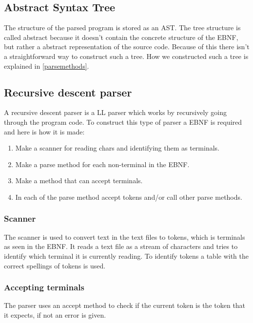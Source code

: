 	\subsection{Abstract Syntax Tree}
		The structure of the parsed program is stored as an AST. The tree structure is called abstract because it doesn't contain the concrete
		structure of the EBNF, but rather a abstract representation of the source code. Because of this there isn't a straightforward way to 
		construct such a tree. How we constructed such a tree is explained in \ref{parsemethods}.
			
	\subsection{Recursive descent parser}
		A recursive descent parser is a LL parser which works by recursively going through the program code.
		To construct this type of parser a EBNF is required and here is how it is made:
		\begin{enumerate}
			\item Make a scanner for reading chars and identifying them as terminals.
			\item Make a parse method for each non-terminal in the EBNF.
			\item Make a method that can accept terminals.
			\item In each of the parse method accept tokens and/or call other parse methods.
		\end{enumerate}
	
		\subsubsection{Scanner}
			The scanner is used to convert text in the text files to tokens, which is terminals as seen in the EBNF. 
			It reads a text file as a stream of characters and tries to identify which terminal it is currently reading.
			To identify tokens a table with the correct spellings of tokens is used.			 
		
		\subsubsection{Accepting terminals}
			The parser uses an accept method to check if the current token is the token that it expects, if not an error is given.
		
